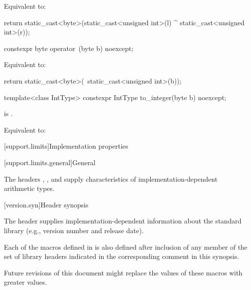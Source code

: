 \begin{itemdescr}
\pnum
\effects
Equivalent to:
\begin{codeblock}
return static_cast<byte>(static_cast<unsigned int>(l) ^ static_cast<unsigned int>(r));
\end{codeblock}
\end{itemdescr}

%
\begin{itemdecl}
constexpr byte operator~(byte b) noexcept;
\end{itemdecl}

\begin{itemdescr}
\pnum
\effects
Equivalent to:
\begin{codeblock}
return static_cast<byte>(~static_cast<unsigned int>(b));
\end{codeblock}
\end{itemdescr}

%
\begin{itemdecl}
template<class IntType>
  constexpr IntType to_integer(byte b) noexcept;
\end{itemdecl}

\begin{itemdescr}
\pnum
\constraints
{} is .

\pnum
\effects
Equivalent to: 
\end{itemdescr}

[support.limits]{Implementation properties}

[support.limits.general]{General}

\pnum
The headers
,
, and
supply characteristics of
%
imple\-mentation-dependent
arithmetic types.

[version.syn]{Header  synopsis}

\pnum
The header 
supplies implementation-dependent information
about the \Cpp{} standard library
(e.g., version number and release date).

\pnum
{}%
Each of the macros defined in  is also defined
after inclusion of any member of the set of library headers
indicated in the corresponding comment in this synopsis.
\begin{note}
Future revisions of this document might replace
the values of these macros with greater values.
\end{note}

